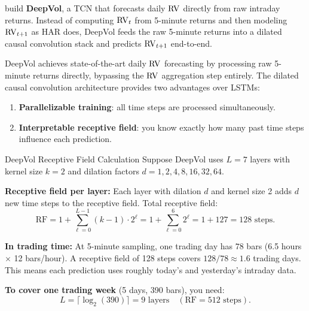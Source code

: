 \citet{MorenoPinoZohren2022DeepVol} build \textbf{DeepVol}, a TCN that forecasts daily $\operatorname{RV}$ directly from raw intraday returns.
Instead of computing $\operatorname{RV}_t$ from 5-minute returns and then modeling $\operatorname{RV}_{t+1}$ as HAR does, DeepVol feeds the raw 5-minute returns into a dilated causal convolution stack and predicts $\operatorname{RV}_{t+1}$ end-to-end.

\begin{keyresult}
DeepVol achieves state-of-the-art daily $\operatorname{RV}$ forecasting by processing raw 5-minute returns directly, bypassing the $\operatorname{RV}$ aggregation step entirely.
The dilated causal convolution architecture provides two advantages over LSTMs:
\begin{enumerate}[nosep]
  \item \textbf{Parallelizable training}: all time steps are processed simultaneously.
  \item \textbf{Interpretable receptive field}: you know exactly how many past time steps influence each prediction.
\end{enumerate}
\end{keyresult}

\begin{workedexample}{DeepVol Receptive Field Calculation}
Suppose DeepVol uses $L = 7$ layers with kernel size $k = 2$ and dilation factors $d = 1, 2, 4, 8, 16, 32, 64$.

\textbf{Receptive field per layer:}
Each layer with dilation $d$ and kernel size 2 adds $d$ new time steps to the receptive field.
Total receptive field:
\[
  \text{RF} = 1 + \sum_{\ell=0}^{L-1} (k-1) \cdot 2^\ell
  = 1 + \sum_{\ell=0}^{6} 2^\ell
  = 1 + 127 = 128 \text{ steps.}
\]

\textbf{In trading time:}
At 5-minute sampling, one trading day has $78$ bars (6.5 hours $\times$ 12 bars/hour).
A receptive field of 128 steps covers $128 / 78 \approx 1.6$ trading days.
This means each prediction uses roughly today's and yesterday's intraday data.

\textbf{To cover one trading week} (5 days, 390 bars), you need:
\[
  L = \lceil \log_2(390) \rceil = 9 \text{ layers} \quad (\text{RF} = 512 \text{ steps}).
\]
\end{workedexample}

